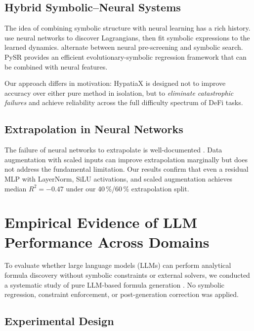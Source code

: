 \documentclass[twoside,11pt]{article}
\newcommand{\Rsq}{R^{2}}
\begin{document}
\subsection{Hybrid Symbolic--Neural Systems}
\label{sec:related_hybrid}

The idea of combining symbolic structure with neural learning has a rich history.
\citet{cranmer2020lagrangian} use neural networks to discover Lagrangians, then
fit symbolic expressions to the learned dynamics.  \citet{udrescu2020ai} alternate
between neural pre-screening and symbolic search.  PySR \citep{cranmer2023pysr}
provides an efficient evolutionary-symbolic regression framework that can be
combined with neural features.

Our approach differs in motivation: HypatiaX is designed not to improve accuracy
over either pure method in isolation, but to \emph{eliminate catastrophic failures}
and achieve reliability across the full difficulty spectrum of DeFi tasks.

\subsection{Extrapolation in Neural Networks}
\label{sec:related_extrap}

The failure of neural networks to extrapolate is well-documented \citep{xu2021neural}.
Data augmentation with scaled inputs \citep{lim2021temporal} can improve extrapolation
marginally but does not address the fundamental limitation.  Our results confirm
that even a residual MLP with LayerNorm, SiLU activations, and scaled augmentation
achieves median $\Rsq=-0.47$ under our 40\,\%/60\,\% extrapolation split.

\section{Empirical Evidence of LLM Performance Across Domains}
\label{sec:llm_limitations}

To evaluate whether large language models (LLMs) can perform analytical formula discovery without symbolic constraints or external solvers, we conducted a systematic study of pure LLM-based formula generation \citep{koza1992gp,kambhampati2024llms}. No symbolic regression, constraint enforcement, or post-generation correction was applied.

\subsection{Experimental Design}
\label{sec:llm_exp_design}
\end{document}
